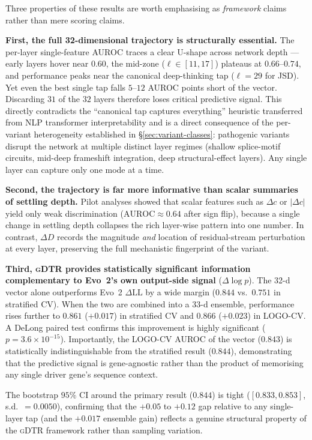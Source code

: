 \documentclass{article}
\theoremstyle{plain}
\theoremstyle{definition}
\theoremstyle{remark}
\newcommand{\gDTR}{\textsc{gDTR}}
\begin{document}
Three properties of these results are worth emphasising as
\emph{framework} claims rather than mere scoring claims.

\textbf{First, the full 32-dimensional trajectory is structurally
essential.} The per-layer single-feature AUROC traces a clear U-shape
across network depth --- early layers hover near $0.60$, the mid-zone
($\ell\in[11,17]$) plateaus at $0.66$--$0.74$, and performance peaks
near the canonical deep-thinking tap ($\ell=29$ for JSD). Yet even the
best single tap falls $5$--$12$ AUROC points short of the vector.
Discarding $31$ of the $32$ layers therefore loses critical predictive
signal. This directly contradicts the ``canonical tap captures
everything'' heuristic transferred from NLP transformer interpretability
and is a direct consequence of the per-variant heterogeneity established
in \S\ref{sec:variant-classes}: pathogenic variants disrupt the network
at multiple distinct layer regimes (shallow splice-motif circuits,
mid-deep frameshift integration, deep structural-effect layers). Any
single layer can capture only one mode at a time.

\textbf{Second, the trajectory is far more informative than scalar
summaries of settling depth.} Pilot analyses showed that scalar
features such as $\Delta c$ or $|\Delta c|$ yield only weak
discrimination ($\mathrm{AUROC}\approx 0.64$ after sign flip), because
a single change in settling depth collapses the rich layer-wise
pattern into one number. In contrast, $\Delta D$ records the magnitude
\emph{and} location of residual-stream perturbation at every layer,
preserving the full mechanistic fingerprint of the variant.

\textbf{Third, \gDTR{} provides statistically significant information
complementary to Evo~2's own output-side signal} ($\Delta\log p$). The
32-d vector alone outperforms Evo~2 $\Delta\mathrm{LL}$ by a wide
margin ($0.844$ vs.\ $0.751$ in stratified CV). When the two are
combined into a 33-d ensemble, performance rises further to $0.861$
($+0.017$) in stratified CV and $0.866$ ($+0.023$) in LOGO-CV. A DeLong
paired test \cite{delong1988comparing} confirms this improvement is
highly significant ($p=3.6\times 10^{-15}$). Importantly, the LOGO-CV
AUROC of the vector ($0.843$) is statistically indistinguishable from
the stratified result ($0.844$), demonstrating that the predictive
signal is gene-agnostic rather than the product of memorising any
single driver gene's sequence context.

The bootstrap $95\%$ CI around the primary result ($0.844$) is tight
($[0.833, 0.853]$, s.d.\ $=0.0050$), confirming that the $+0.05$ to
$+0.12$ gap relative to any single-layer tap (and the $+0.017$ ensemble
gain) reflects a genuine structural property of the \gDTR{} framework
rather than sampling variation.
\end{document}
